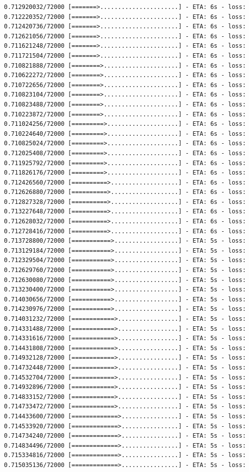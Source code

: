\documentclass[12pt,fleqn]{article}\usepackage{../../common}
\begin{document}
\begin{verbatim}
0.712920032/72000 [=======>......................] - ETA: 6s - loss: 0.712220352/72000 [=======>......................] - ETA: 6s - loss: 0.712420736/72000 [=======>......................] - ETA: 6s - loss: 0.712621056/72000 [=======>......................] - ETA: 6s - loss: 0.711621248/72000 [=======>......................] - ETA: 6s - loss: 0.711721504/72000 [=======>......................] - ETA: 6s - loss: 0.710821888/72000 [========>.....................] - ETA: 6s - loss: 0.710622272/72000 [========>.....................] - ETA: 6s - loss: 0.710722656/72000 [========>.....................] - ETA: 6s - loss: 0.710823104/72000 [========>.....................] - ETA: 6s - loss: 0.710823488/72000 [========>.....................] - ETA: 6s - loss: 0.710223872/72000 [========>.....................] - ETA: 6s - loss: 0.711024256/72000 [=========>....................] - ETA: 6s - loss: 0.710224640/72000 [=========>....................] - ETA: 6s - loss: 0.710825024/72000 [=========>....................] - ETA: 6s - loss: 0.712025408/72000 [=========>....................] - ETA: 6s - loss: 0.711925792/72000 [=========>....................] - ETA: 6s - loss: 0.711826176/72000 [=========>....................] - ETA: 6s - loss: 0.712426560/72000 [==========>...................] - ETA: 6s - loss: 0.712626880/72000 [==========>...................] - ETA: 6s - loss: 0.712827328/72000 [==========>...................] - ETA: 6s - loss: 0.713227648/72000 [==========>...................] - ETA: 6s - loss: 0.712628032/72000 [==========>...................] - ETA: 6s - loss: 0.712728416/72000 [==========>...................] - ETA: 6s - loss: 0.713728800/72000 [===========>..................] - ETA: 5s - loss: 0.713129184/72000 [===========>..................] - ETA: 5s - loss: 0.712329504/72000 [===========>..................] - ETA: 5s - loss: 0.712629760/72000 [===========>..................] - ETA: 5s - loss: 0.712630080/72000 [===========>..................] - ETA: 5s - loss: 0.713230400/72000 [===========>..................] - ETA: 5s - loss: 0.714030656/72000 [===========>..................] - ETA: 5s - loss: 0.714230976/72000 [===========>..................] - ETA: 5s - loss: 0.714031232/72000 [============>.................] - ETA: 5s - loss: 0.714331488/72000 [============>.................] - ETA: 5s - loss: 0.714331616/72000 [============>.................] - ETA: 5s - loss: 0.714431808/72000 [============>.................] - ETA: 5s - loss: 0.714932128/72000 [============>.................] - ETA: 5s - loss: 0.714732448/72000 [============>.................] - ETA: 5s - loss: 0.714532704/72000 [============>.................] - ETA: 5s - loss: 0.714932896/72000 [============>.................] - ETA: 5s - loss: 0.714833152/72000 [============>.................] - ETA: 5s - loss: 0.714733472/72000 [============>.................] - ETA: 5s - loss: 0.714433600/72000 [=============>................] - ETA: 5s - loss: 0.714533920/72000 [=============>................] - ETA: 5s - loss: 0.714734240/72000 [=============>................] - ETA: 5s - loss: 0.714834496/72000 [=============>................] - ETA: 5s - loss: 0.715334816/72000 [=============>................] - ETA: 5s - loss: 0.715035136/72000 [=============>................] - ETA: 5s - loss: 
\end{verbatim}
\end{document}
